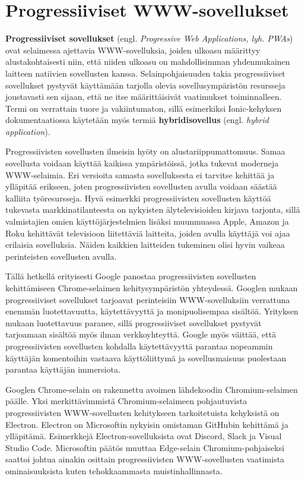 \documentclass[utf8]{gradu3}
\begin{document}
\section{Progressiiviset WWW-sovellukset}

\textbf{Progressiiviset sovellukset} (engl. \textit{Progressive Web Applications, lyh. PWAs}) ovat selaimessa ajettavia WWW-sovelluksia, joiden ulkoasu määrittyy alustakohtaisesti niin, että niiden ulkoasu on mahdollisimman yhdenmukainen laitteen natiivien sovellusten kanssa. Selainpohjaisuuden takia progressiiviset sovellukset pystyvät käyttämään tarjolla olevia sovellusympäristön resursseja joustavasti sen sijaan, että ne itse määrittäisivät vaatimukset toiminnalleen. Termi on verrattain tuore ja vakiintumaton, sillä esimerkiksi Ionic-kehyksen dokumentaatiossa käytetään myös termiä \textbf{hybridisovellus} (engl. \textit{hybrid application}).

Progressiivisten sovellusten ilmeisin hyöty on alustariippumattomuus. Samaa sovellusta voidaan käyttää kaikissa ympäristöissä, jotka tukevat moderneja WWW-selaimia. Eri versioita samasta sovelluksesta ei tarvitse kehittää ja ylläpitää erikseen, joten progressiivisten sovellusten avulla voidaan säästää kalliita työresursseja. Hyvä esimerkki progressiivisten sovellusten käyttöä tukevasta markkinatilanteesta on nykyisten älytelevisioiden kirjava tarjonta, sillä valmistajien omien käyttöjärjestelmien lisäksi muunmuassa Apple, Amazon ja Roku kehittävät televisioon liitettäviä laitteita, joiden avulla käyttäjä voi ajaa erilaisia sovelluksia. Näiden kaikkien laitteiden tukeminen olisi hyvin vaikeaa perinteisten sovellusten avulla. \parencite[]{frankston-pwa}

Tällä hetkellä erityisesti Google panostaa progressiivisten sovellusten kehittämiseen Chrome-selaimen kehitysympäristön yhteydessä. Googlen \parencite[]{google-pwa-marketing} mukaan progressiiviset sovellukset tarjoavat perinteisiin WWW-sovelluksiin verrattuna enemmän luotettavuutta, käytettävyyttä ja monipuolisempaa sisältöä. Yrityksen mukaan luotettavuus paranee, sillä progressiiviset sovellukset pystyvät tarjoamaan sisältöä myös ilman verkkoyhteyttä. Google myös väittää, että progressiivisten sovellusten kohdalla käytettävyyttä parantaa nopeammin käyttäjän komentoihin vastaava käyttöliittymä ja sovellusmaisuus puolestaan parantaa käyttäjän immersiota.

Googlen Chrome-selain on rakennettu avoimen lähdekoodin Chromium-selaimen päälle. Yksi merkittävimmistä Chromium-selaimeen pohjautuvista progressiivisten WWW-sovellusten kehitykseen tarkoitetuista kehyksistä on Electron. Electron on Microsoftin nykyisin omistaman GitHubin kehittämä ja ylläpitämä. Esimerkkejä Electron-sovelluksista ovat Discord, Slack ja Visual Studio Code. Microsoftin päätös muuttaa Edge-selain Chromium-pohjaiseksi saattoi johtua ainakin osittain progressiivisten WWW-sovellusten vaatimista ominaisuuksista kuten tehokkaammasta muistinhallinnasta.
\end{document}

